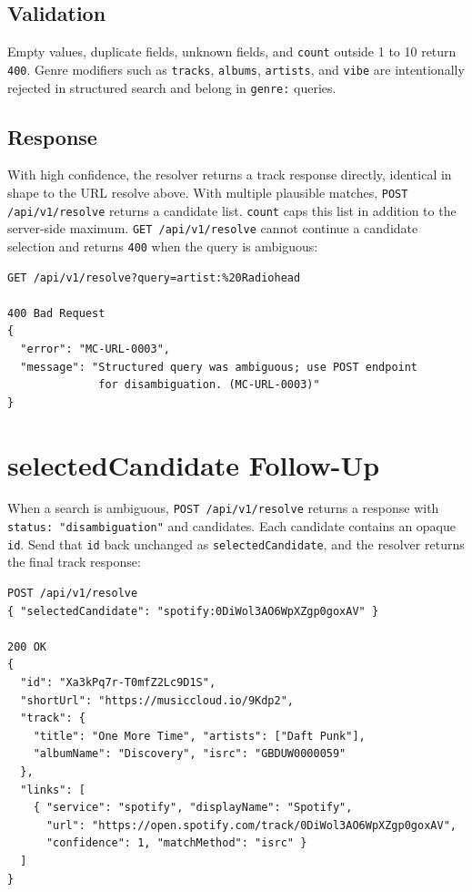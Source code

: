 \documentclass[11pt,a4paper]{article}
\newcommand{\code}[1]{\texttt{#1}}
\begin{document}
\subsection{Validation}

Empty values, duplicate fields, unknown fields, and \code{count} outside 1 to 10 return \code{400}. Genre modifiers such as \code{tracks}, \code{albums}, \code{artists}, and \code{vibe} are intentionally rejected in structured search and belong in \code{genre:} queries.

\subsection{Response}

With high confidence, the resolver returns a track response directly, identical in shape to the URL resolve above. With multiple plausible matches, \code{POST /api/v1/resolve} returns a candidate list. \code{count} caps this list in addition to the server-side maximum. \code{GET /api/v1/resolve} cannot continue a candidate selection and returns \code{400} when the query is ambiguous:

\begingroup\small\begin{verbatim}
GET /api/v1/resolve?query=artist:%20Radiohead

400 Bad Request
{
  "error": "MC-URL-0003",
  "message": "Structured query was ambiguous; use POST endpoint
              for disambiguation. (MC-URL-0003)"
}
\end{verbatim}\endgroup

\section{selectedCandidate Follow-Up}

When a search is ambiguous, \code{POST /api/v1/resolve} returns a response with \code{status: "disambiguation"} and candidates. Each candidate contains an opaque \code{id}. Send that \code{id} back unchanged as \code{selectedCandidate}, and the resolver returns the final track response:

\begingroup\small\begin{verbatim}
POST /api/v1/resolve
{ "selectedCandidate": "spotify:0DiWol3AO6WpXZgp0goxAV" }

200 OK
{
  "id": "Xa3kPq7r-T0mfZ2Lc9D1S",
  "shortUrl": "https://musiccloud.io/9Kdp2",
  "track": {
    "title": "One More Time", "artists": ["Daft Punk"],
    "albumName": "Discovery", "isrc": "GBDUW0000059"
  },
  "links": [
    { "service": "spotify", "displayName": "Spotify",
      "url": "https://open.spotify.com/track/0DiWol3AO6WpXZgp0goxAV",
      "confidence": 1, "matchMethod": "isrc" }
  ]
}
\end{verbatim}\endgroup
\end{document}

